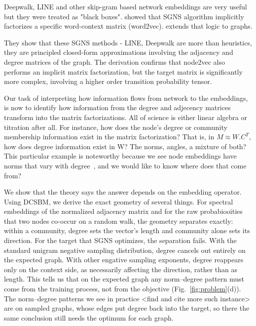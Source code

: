 \documentclass[aps,pre,reprint,superscriptaddress,longbibliography]{revtex4-2}
\begin{document}
Deepwalk, LINE and other skip-gram based network embeddings are very useful but they were treated as "black boxes".
\cite{levy2014neural} showed that SGNS algorithm implicitly factorizes a specific word-context matrix (word2vec). 
\cite{qiu2018network} extends that logic to graphs.

They show that these SGNS methods - LINE, Deepwalk are more than heuristics, they are principled closed-form approximations involving the adjacency and degree matrices of the graph.
The derivation confirms that node2vec also performs an implicit matrix factorization, but the target matrix is significantly more complex, involving a higher order transition probability tensor. 

Our task of interpreting how information flows from network to the embeddings, is now to identify how information from the degree and adjecency matrices transform into the matrix factorizations. All of science is either linear algebra or titration after all.
For instance, how does the node's degree or community membership information exist in the matrix factorization? 
That is, in $M \approx W. C^T $, how does degree information exist in W? The norms, angles, a mixture of both?
This particular example is noteworthy because we see node embeddings have norms that vary with degree~\cite{murray2023unsupervised}, and we would like to know where does that come from? 


We show that the theory says the answer depends on the embedding operator. 
Using DCSBM, we derive the exact geometry of several things.
For spectral embeddings of the normalized adjacency matrix and for the raw probabiooities that two nodes co-occur on a random walk, the geometry separates exactly: within a community, degree sets the vector's length and community alone sets its direction. 
For the target that SGNS optimizes, the separation fails. 
With the standard unigram negative sampling distribution, degree cancels out entirely on the expected graph.
With other engative sampling exponents, degree reappears only on the context side, as necessarily affecting the direction, rather than as length. 
This tells us that on the expected graph any norm--degree pattern must come from the training process, not from the objective (Fig.~\ref{fig:problem}(d)).
The norm--degree patterns we see in practice <find and cite more such instance> are on sampled graphs, whose edges put degree back into the target, so there the same conclusion still needs the optimum for each graph.
\end{document}
